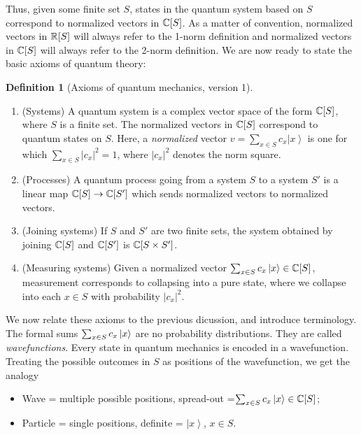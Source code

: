 \documentclass{article}
\theoremstyle{definition}
\newtheorem*{definition}{Definition}
\numberwithin{figure}{section}
\begin{document}
Thus, given some finite set $S$, states in the quantum system based on $S$ correspond to normalized vectors in $\mathbb{C}[S]$. As a matter of convention, normalized vectors in $\mathbb{R}[S]$ will always refer to the 1-norm definition and normalized vectors in $\mathbb{C}[S]$ will always refer to the 2-norm definition. We are now ready to state the basic axioms of quantum theory:

\begin{definition}[Axioms of quantum mechanics, version 1] $\,$

\begin{enumerate}
\item (Systems) A quantum system is a complex vector space of the form $\mathbb{C}[S]$, where $S$ is a finite set. The normalized vectors in $\mathbb{C}[S]$ correspond to quantum states on $S$. Here, a \textit{normalized} vector $v=\sum_{x\in S}c_x\left|x\right>$ is one for which $\sum_{x\in S}|c_x|^2=1$, where $|c_x|^2$ denotes the norm square.
\item (Processes) A quantum process going from a system $S$ to a system $S'$ is a linear map $\mathbb{C}[S]\to \mathbb{C}[S']$ which sends normalized vectors to normalized vectors.
\item (Joining systems) If $S$ and $S'$ are two finite sets, the system obtained by joining $\mathbb{C}[S]$ and $\mathbb{C}[S']$ is $\mathbb{C}[S\times S']$.
\item (Measuring systems) Given a normalized vector $\sum_{x\in S}c_x \left |x\right>\in \mathbb{C}[S]$, measurement corresponds to collapsing into a pure state, where we collapse into each $x\in S$ with probability $|c_x|^2$.
\end{enumerate}

\raggedleft\qedsymbol{}
\end{definition}

We now relate these axioms to the previous dicussion, and introduce terminology. The formal sums $\sum_{x\in S}c_x\ket{x}$ are no probability distributions. They are called \textit{wavefunctions}. Every state in quantum mechanics is encoded in a wavefunction. Treating the possible outcomes in $S$ as positions of the wavefunction, we get the analogy

\begin{itemize}
\item Wave = multiple possible positions, spread-out =$\sum_{x\in S}c_x\ket{x}\in \mathbb{C}[S]$;
\item Particle = single positions, definite = $\left|x\right>$, $x\in S$.
\end{itemize}
\end{document}
